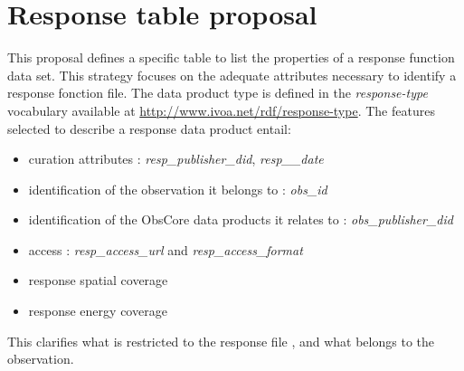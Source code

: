 
\newpage

\section*{Response table  proposal}

This  proposal defines a specific table to list the properties of a response function data set. 
This strategy focuses on the adequate attributes necessary to identify a response fonction file. 
The data product type is defined in the \emph{response-type} vocabulary available at 
\url{http://www.ivoa.net/rdf/response-type}. 
The features selected to describe a response data product entail: 
\begin{itemize}
\item curation attributes : \emph{resp\_publisher\_did}, \emph{resp\_\_date}
\item identification of the observation it belongs to : \emph{obs\_id}
\item identification of the ObsCore data products it relates to : \emph{obs\_publisher\_did}
\item access : \emph{resp\_access\_url} and \emph{resp\_access\_format}
\item response spatial coverage
\item response energy coverage
\end{itemize}

This clarifies what is restricted to the response file , and what belongs to the observation. 

